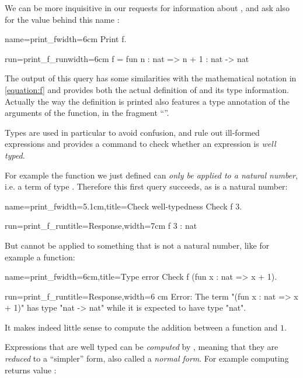 We can be more inquisitive in our requests for information about
, and ask also for the value behind this name :

\begin{coq}{name=print_f}{width=6cm}
Print f.
$~$
\end{coq}
\begin{coqout}{run=print_f_run}{width=6cm}
f = fun n : nat => n + 1
  : nat -> nat
\end{coqout}

The output of this  query has some similarities with the
 mathematical notation in \eqref{equation:f} and provides both the
 actual definition of  and its type information. Actually the way
 the definition is printed also features a type annotation of the
 arguments of the function, in the fragment ``''.

Types are used in particular to avoid confusion, and rule out
ill-formed expressions and \Coq{} provides a command to check whether
an expression is \emph{well typed}.

For example the function  we just defined can \emph{only be
  applied to a natural number}, i.e. a term of type . Therefore
this first query succeeds, as  is a natural number:

\begin{coq}{name=print_f}{width=5.1cm,title=Check well-typedness}
Check f 3.
\end{coq}
\begin{coqout}{run=print_f_run}{title=Response,width=7cm}
 f 3 : nat
\end{coqout}
But  cannot be applied to something that is not a natural number,
like for example a function:

\begin{coq}{name=print_f}{width=6cm,title=Type error}
Check f (fun x : nat => x + 1).
$~$
$~$
\end{coq}
\begin{coqout}{run=print_f_run}{title=Response,width=6
cm}
Error:
The term "(fun x : nat => x + 1)"
has type "nat -> nat" while it is
expected to have type "nat".
\end{coqout}
It makes indeed little sense to compute the addition between
a function and $1$.

Expressions that are well typed can be \emph{computed} by \Coq{},
meaning that they are \emph{reduced} to a ``simpler'' form, also
called a \emph{normal form}. For example computing  returns
value :

